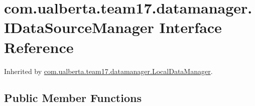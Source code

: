 \hypertarget{interfacecom_1_1ualberta_1_1team17_1_1datamanager_1_1_i_data_source_manager}{\section{com.\+ualberta.\+team17.\+datamanager.\+I\+Data\+Source\+Manager Interface Reference}
\label{interfacecom_1_1ualberta_1_1team17_1_1datamanager_1_1_i_data_source_manager}
}


Inherited by \hyperlink{classcom_1_1ualberta_1_1team17_1_1datamanager_1_1_local_data_manager}{com.\+ualberta.\+team17.\+datamanager.\+Local\+Data\+Manager}.

\subsection*{Public Member Functions}
